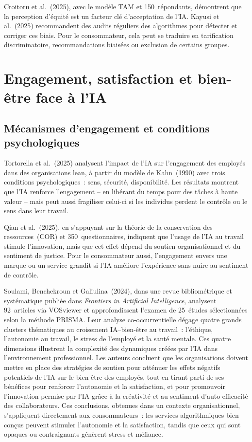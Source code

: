 \documentclass[12pt,a4paper]{article}
\begin{document}
Croitoru et al.~(2025), avec le modèle TAM et 150~répondants, démontrent que la perception
d'équité est un facteur clé d'acceptation de l'IA. Kayusi et al.~(2025) recommandent des
audits réguliers des algorithmes pour détecter et corriger ces biais. Pour le consommateur,
cela peut se traduire en tarification discriminatoire, recommandations biaisées ou exclusion
de certains groupes.

\section{Engagement, satisfaction et bien-être face à l'IA}

\subsection{Mécanismes d'engagement et conditions psychologiques}

Tortorella et al.~(2025) analysent l'impact de l'IA sur l'engagement des employés dans des
organisations lean, à partir du modèle de Kahn~(1990) avec trois conditions psychologiques~:
sens, sécurité, disponibilité. Les résultats montrent que l'IA renforce l'engagement -- en
libérant du temps pour des tâches à haute valeur -- mais peut aussi fragiliser celui-ci si
les individus perdent le contrôle ou le sens dans leur travail.

Qian et al.~(2025), en s'appuyant sur la théorie de la conservation des ressources~(COR) et
350~questionnaires, indiquent que l'usage de l'IA au travail stimule l'innovation, mais que
cet effet dépend du soutien organisationnel et du sentiment de justice. Pour le consommateur
aussi, l'engagement envers une marque ou un service grandit si l'IA améliore l'expérience
sans nuire au sentiment de contrôle.

Soulami, Benchekroun et Galiulina~(2024), dans une revue bibliométrique et systématique
publiée dans \emph{Frontiers in Artificial Intelligence}, analysent 92~articles via
VOSviewer et approfondissent l'examen de 25~études sélectionnées selon la méthode
PRISMA. Leur analyse co-occurrentielle dégage quatre grands clusters thématiques au croisement
IA--bien-être au travail~: l'éthique, l'autonomie au travail, le stress de l'employé et la santé
mentale. Ces quatre dimensions illustrent la complexité des dynamiques créées par l'IA
dans l'environnement professionnel. Les auteurs concluent que les organisations doivent
mettre en place des stratégies de soutien pour atténuer les effets négatifs potentiels de l'IA
sur le bien-être des employés, tout en tirant parti de ses bénéfices pour renforcer
l'autonomie et la satisfaction, et pour promouvoir l'innovation permise par l'IA grâce à la
créativité et au sentiment d'auto-efficacité des collaborateurs. Ces conclusions, obtenues
dans un contexte organisationnel, s'appliquent directement aux consommateurs~: les
services algorithmiques bien conçus peuvent stimuler l'autonomie et la satisfaction, tandis
que ceux qui sont opaques ou contraignants génèrent stress et méfiance.
\end{document}
